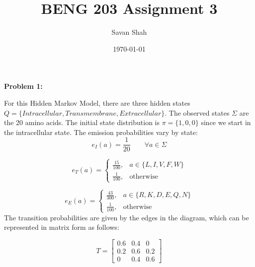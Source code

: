 \documentclass{article}
\title{BENG 203 Assignment 3}
\author{Savan Shah}
\date{\today}
\begin{document}
\maketitle

\textbf{Problem 1:}
\begin{center}
\end{center}

For this Hidden Markov Model, there are three hidden states $Q = \{Intracellular, Transmembrane, Extracellular\}$.
The observed states $\Sigma$ are the 20 amino acids. The initial state distribution is $\pi = \{1, 0, 0\}$ since we start in the intracellular state.
The emission probabilities vary by state:
\[
e_I(a)=\frac{1}{20}
\qquad \forall a \in \Sigma
\]

\[
e_T(a)=
\begin{cases}
\frac{15}{100}, & a \in \{L,I,V,F,W\} \\[6pt]
\frac{1}{100}, & \text{otherwise}
\end{cases}
\]

\[
e_E(a)=
\begin{cases}
\frac{43}{300}, & a \in \{R,K,D,E,Q,N\} \\[6pt]
\frac{1}{100}, & \text{otherwise}
\end{cases}
\]
The transition probabilities are given by the edges in the diagram, which can be represented in matrix form as follows:
\begin{center}
    \[
T =
\begin{bmatrix}
0.6 & 0.4 & 0 \\
0.2 & 0.6 & 0.2 \\
0   & 0.4 & 0.6
\end{bmatrix}
\]
\end{center}
\end{document}
